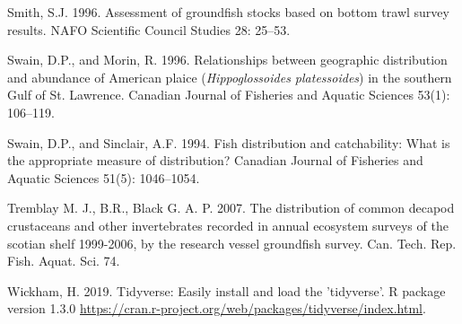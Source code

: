 \documentclass[12pt]{article}\usepackage[]{graphicx}\usepackage[]{color}
\begin{document}
\leavevmode\hypertarget{ref-Smith:1996}{}%
Smith, S.J. 1996. Assessment of groundfish stocks based on bottom trawl survey results. NAFO Scientific Council Studies 28: 25--53.

\leavevmode\hypertarget{ref-Swain:Morin:1996:cjfas}{}%
Swain, D.P., and Morin, R. 1996. Relationships between geographic distribution and abundance of American plaice (\emph{Hippoglossoides platessoides}) in the southern Gulf of St. Lawrence. Canadian Journal of Fisheries and Aquatic Sciences 53(1): 106--119.

\leavevmode\hypertarget{ref-Swain:Sinclair:1994:cjfas}{}%
Swain, D.P., and Sinclair, A.F. 1994. Fish distribution and catchability: What is the appropriate measure of distribution? Canadian Journal of Fisheries and Aquatic Sciences 51(5): 1046--1054.

\leavevmode\hypertarget{ref-Tremblayetal:2007}{}%
Tremblay M. J., B.R., Black G. A. P. 2007. The distribution of common decapod crustaceans and other invertebrates recorded in annual ecosystem surveys of the scotian shelf 1999-2006, by the research vessel groundfish survey. Can. Tech. Rep. Fish. Aquat. Sci. 74.

\leavevmode\hypertarget{ref-R:Tidyverse}{}%
Wickham, H. 2019. Tidyverse: Easily install and load the 'tidyverse'. R package version 1.3.0 \url{https://cran.r-project.org/web/packages/tidyverse/index.html}.
\end{document}
